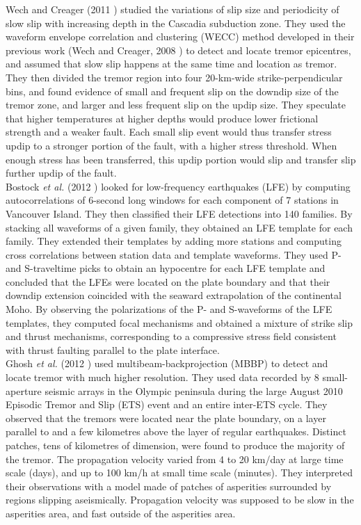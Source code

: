 \documentclass[main.tex]{subfiles}
\begin{document}
Wech and Creager (2011 \cite{WEC_2011}) studied the variations of slip size and periodicity of slow slip with increasing depth in the Cascadia subduction zone. They used the waveform envelope correlation and clustering (WECC) method developed in their previous work (Wech and Creager, 2008 \cite{WEC_2008}) to detect and locate tremor epicentres, and assumed that slow slip happens at the same time and location as tremor. They then divided the tremor region into four 20-km-wide strike-perpendicular bins, and found evidence of small and frequent slip on the downdip size of the tremor zone, and larger and less frequent slip on the updip size. They speculate that higher temperatures at higher depths would produce lower frictional strength and a weaker fault. Each small slip event would thus transfer stress updip to a stronger portion of the fault, with a higher stress threshold. When enough stress has been transferred, this updip portion would slip and transfer slip further updip of the fault. \\

Bostock \textit{et al.} (2012 \cite{BOS_2012}) looked for low-frequency earthquakes (LFE) by computing autocorrelations of 6-second long windows for each component of 7 stations in Vancouver Island. They then classified their LFE detections into 140 families. By stacking all waveforms of a given family, they obtained an LFE template for each family. They extended their templates by adding more stations and computing cross correlations between station data and template waveforms. They used P- and S-traveltime picks to obtain an hypocentre for each LFE template and concluded that the LFEs were located on the plate boundary and that their downdip extension coincided with the seaward extrapolation of the continental Moho. By observing the polarizations of the P- and S-waveforms of the LFE templates, they computed focal mechanisms and obtained a mixture of strike slip and thrust mechanisms, corresponding to a compressive stress field consistent with thrust faulting parallel to the plate interface. \\

Ghosh \textit{et al.} (2012 \cite{GHO_2012}) used multibeam-backprojection (MBBP) to detect and locate tremor with much higher resolution. They used data recorded by 8 small-aperture seismic arrays in the Olympic peninsula during the large August 2010 Episodic Tremor and Slip (ETS) event and an entire inter-ETS cycle. They observed that the tremors were located near the plate boundary, on a layer parallel to and a few kilometres above the layer of regular earthquakes. Distinct patches, tens of kilometres of dimension, were found to produce the majority of the tremor. The propagation velocity varied from 4 to 20 km/day at large time scale (days), and up to 100 km/h at small time scale (minutes). They interpreted their observations with a model made of patches of asperities surrounded by regions slipping aseismically. Propagation velocity was supposed to be slow in the asperities area, and fast outside of the asperities area. \\
\end{document}

